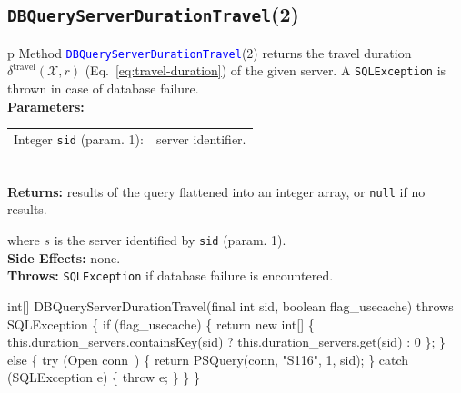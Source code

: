 \subsection{\texttt{DBQueryServerDurationTravel}(2)}
\begin{tabular}{p{\textwidth}}
\toprule
{}
Method \textcolor{blue}{{\tt{}\protect{}DBQueryServerDurationTravel}}(2) returns the
travel duration $\delta^\textrm{travel}(\mathcal{X},r)$
(Eq.~\ref{eq:travel-duration}) of the given server.
A {\tt{}SQLException} is thrown in case of database failure.\\
\midrule
\textbf{Parameters:}\\
\begin{tabular}{lp{116mm}}
Integer {\tt{}sid} (param. 1):&server identifier.
\end{tabular}\\
\textbf{Returns:} results of the query flattened into an integer array,
or {\tt{}null} if no results.


where $s$ is the server identified by {\tt{}sid} (param. 1).\\
\textbf{Side Effects:} none.\\
\textbf{Throws:} {\tt{}SQLException} if database failure is encountered.\\
\bottomrule
\end{tabular}
\nwenddocs{}\endmoddef{}
int[] DBQueryServerDurationTravel(final int sid, boolean flag_usecache) throws SQLException \{
  if (flag_usecache) \{
    return new int[] \{ this.duration_servers.containsKey(sid)
      ? this.duration_servers.get(sid)
      : 0 \};
  \} else \{
    try (\LA{}Open \code{}conn\edoc{}~{\nwtagstyle{}}\RA{}) \{
      return PSQuery(conn, "S116", 1, sid);
    \} catch (SQLException e) \{
      throw e;
    \}
  \}
\}
\eatline
{}\nwendcode{}\nwdocspar
